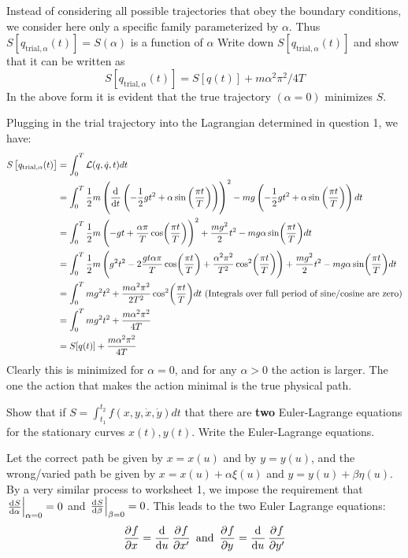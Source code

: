 \begin{p}
Instead of considering all possible trajectories that obey the boundary conditions, we consider here only a specific family parameterized by $\alpha .$ Thus $S\left[q_{\text {trial}, \alpha}(t)\right]=S(\alpha)$ is a function of $\alpha$ Write down $S\left[q_{\text {trial}, \alpha}(t)\right]$ and show that it can be written as
\[ S\left[q_{\text {trial}, \alpha}(t)\right]=S[q(t)]+m \alpha^{2} \pi^{2} / 4 T \]
In the above form it is evident that the true trajectory $(\alpha=0)$ minimizes $S$.
\end{p}
\begin{s}
Plugging in the trial trajectory into the Lagrangian determined in question 1, we have:
\begin{align*}
S\left[q_{\text {trial}, \alpha}(t)\right] &= \int_{0}^T \LL(q,\dot{q}, t)dt
\\ &= \int_{0}^T\frac{1}{2}m\left(\dod{}{t}\left(-\frac{1}{2} g t^{2}+\alpha \sin \left(\frac{\pi t}{T}\right)\right)\right)^2 - mg\left(-\frac{1}{2} g t^{2}+\alpha \sin \left(\frac{\pi t}{T}\right)\right)dt
\\ &= \int_{0}^T\frac{1}{2}m\left(-gt + \frac{\alpha \pi}{T}\cos(\frac{\pi t}{T})\right)^2 + \frac{mg^2}{2}t^2 - mg\alpha\sin(\frac{\pi t}{T}) dt
\\ &= \int_0^T \frac{1}{2}m\left(g^2t^2 - 2\frac{gt\alpha\pi}{T}\cos(\frac{\pi t}{T}) + \frac{\alpha^2\pi^2}{T^2}\cos[2](\frac{\pi t}{T})\right) + \frac{mg^2}{2}t^2 - mg\alpha\sin(\frac{\pi t}{T}) dt
\\ &= \int_0^T mg^2t^2 + \frac{m\alpha^2\pi^2}{2T^2}\cos[2](\frac{\pi t}{T}) dt \text{ (Integrals over full period of sine/cosine are zero)}
\\ &= \int_0^T mg^2t^2 + \frac{m\alpha^2 \pi^2}{4T}
\\ &= S[q(t)] + \frac{m\alpha^2 \pi^2}{4T}
\end{align*}
Clearly this is minimized for $\alpha = 0$, and for any $\alpha > 0$ the action is larger. The one the action that makes the action minimal is the true physical path.
\end{s}

\begin{p}
Show that if $S = \int_{t_1}^{t_2} f(x, y, \dot{x}, \dot{y}) dt$ that there are \textbf{two} Euler-Lagrange equations for the stationary curves $x(t), y(t)$. Write the Euler-Lagrange equations.
\end{p}
\begin{s}
Let the correct path be given by $x = x(u)$ and by $y = y(u)$, and the wrong/varied path be given by $x = x(u) + \alpha\xi(u)$ and $y = y(u) + \beta\eta(u)$. By a very similar process to worksheet 1, we impose the requirement that $\left. \od{S}{\alpha}\right|_{\alpha = 0} = 0$ and $\left. \od{S}{\beta}\right|_{\beta = 0} = 0$. This leads to the two Euler Lagrange equations:
\[\dpd{f}{x} = \dod{}{u}\dpd{f}{x'} \text{ and } \dpd{f}{y} = \dod{}{u}\dpd{f}{y'}\]
\end{s}

